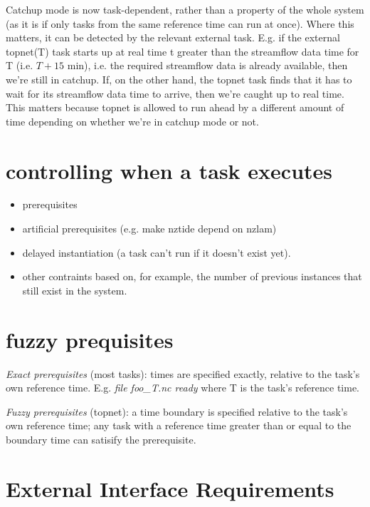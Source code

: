 \documentclass[11pt,a4paper]{report}
\begin{document}
Catchup mode is now task-dependent, rather than a property of the whole
system (as it is if only tasks from the same reference time can run at
once).  Where this matters, it can be detected by the relevant external
task. E.g. if the external topnet(T) task starts up at real time t
greater than the streamflow data time for T (i.e. $T+15$ min), i.e. the
required streamflow data is already available, then we're still in
catchup. If, on the other hand, the topnet task finds that it has to
wait for its streamflow data time to arrive, then we're caught up to
real time.  This matters because topnet is allowed to run ahead by a
different amount of time depending on whether we're in catchup mode or
not.


\section{controlling when a task executes}

\begin{itemize}
 \item  prerequisites
 \item artificial prerequisites (e.g. make nztide depend on nzlam)
 \item delayed instantiation (a task can't run if it doesn't exist yet).
 \item other contraints based on, for example, the number of previous
 instances that still exist in the system.
\end{itemize}


\section{fuzzy prequisites}

{\em Exact prerequisites} (most tasks): times are specified exactly,
relative to the task's own reference time.  E.g. {\em file foo\_{T}.nc
ready} where T is the task's reference time.

{\em Fuzzy prerequisites} (topnet): a time boundary is specified
relative to the task's own reference time; any task with a reference
time greater than or equal to the boundary time can satisify the
prerequisite.

\section{External Interface Requirements}
\end{document}
